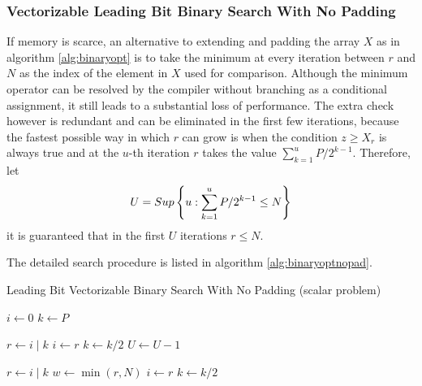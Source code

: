 \documentclass[preprint,1p,times]{elsarticle}
\begin{document}
\subsubsection{Vectorizable Leading Bit Binary Search With No Padding}
If memory is scarce, an alternative to extending and padding the array $X$ as in algorithm \ref{alg:binaryopt} is to take the minimum at every iteration between $r$ and $N$ as the index of the element in $X$ used for comparison.
Although the minimum operator can be resolved by the compiler without branching as a conditional assignment, it still leads to a substantial loss of performance. The extra check however is redundant and can be eliminated in the first few iterations, because the fastest possible way in which $r$ can grow is when the condition $z \geq X_r$ is always true and at the $u$-th iteration $r$ takes the value $\sum_{k=1}^u P/ 2^{k-1}$. Therefore, let $$U= Sup \left \{  u: \sum_{k=1}^u P/2^{k-1} \leq N \right \} $$ it is guaranteed that in the first $U$ iterations $r \leq N$.

The detailed search procedure is listed in algorithm \ref{alg:binaryoptnopad}.

\begin{algorithm}[ht]
\caption{Leading Bit Vectorizable Binary Search With No Padding (scalar problem)}
\label{alg:binaryoptnopad}
\begin{algorithmic}
\State $i \leftarrow 0$
\State $k \leftarrow P$

\Repeat
       \State $r \leftarrow i\;|\;k$ 
	   
        	\State $i \leftarrow r$
	\EndIf
	\State $k \leftarrow k/2$  
   \State $U \leftarrow U-1$

    	\State $r \leftarrow i\;|\;k$ 
    	\State $w \leftarrow \min(r,N)$  
        	\State $i \leftarrow r$    
    	\EndIf
	\State $k \leftarrow k / 2$ 
\EndWhile
\EndFunction
\end{algorithmic}
\end{algorithm}
\end{document}
